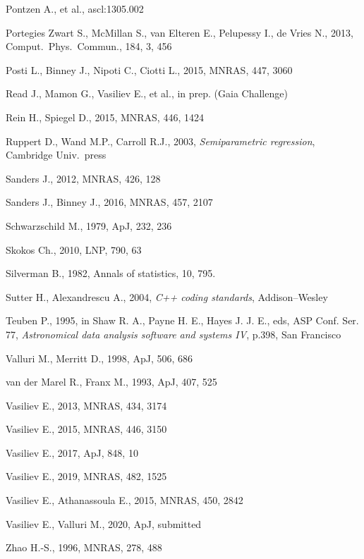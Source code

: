 \documentclass[12pt]{article}
\begin{document}
\begin{thebibliography}{99}
Pontzen A., et al., ascl:1305.002

Portegies Zwart S., McMillan S., van Elteren E., Pelupessy I., de Vries N., 2013, Comput.\ Phys.\ Commun., 184, 3, 456

Posti L., Binney J., Nipoti C., Ciotti L., 2015, MNRAS, 447, 3060

Read J., Mamon G., Vasiliev E., et al., in prep. (Gaia Challenge)

Rein H., Spiegel D., 2015, MNRAS, 446, 1424

Ruppert D., Wand M.P., Carroll R.J., 2003, \textsl{Semiparametric regression}, Cambridge Univ.\ press

Sanders J., 2012, MNRAS, 426, 128

Sanders J., Binney J., 2016, MNRAS, 457, 2107

Schwarzschild M., 1979, ApJ, 232, 236

Skokos Ch., 2010, LNP, 790, 63

Silverman B., 1982, Annals of statistics, 10, 795.

Sutter H., Alexandrescu A., 2004, \textsl{C++ coding standards}, Addison--Wesley

Teuben P., 1995, in Shaw R. A., Payne H. E., Hayes J. J. E., eds, ASP Conf. Ser. 77,
\textsl{Astronomical data analysis software and systems IV}, p.398, San Francisco

Valluri M., Merritt D., 1998, ApJ, 506, 686

van der Marel R., Franx M., 1993, ApJ, 407, 525

Vasiliev E., 2013, MNRAS, 434, 3174

Vasiliev E., 2015, MNRAS, 446, 3150

Vasiliev E., 2017, ApJ, 848, 10

Vasiliev E., 2019, MNRAS, 482, 1525

Vasiliev E., Athanassoula E., 2015, MNRAS, 450, 2842

Vasiliev E., Valluri M., 2020, ApJ, submitted

Zhao H.-S., 1996, MNRAS, 278, 488

\end{thebibliography}
\end{document}
